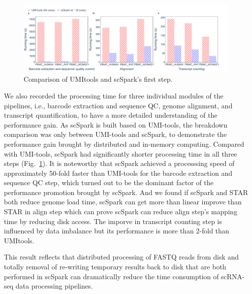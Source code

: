\documentclass[conference]{IEEEtran}
\begin{document}
\begin{figure}
	\centering
	\includegraphics[width=0.98\textwidth]{fig2.pdf}
	\caption{Comparison of UMI\-tools and scSpark's first step.} \label{fig2}
\end{figure}
We also recorded the processing time for three individual modules of the pipelines, i.e., barcode extraction and sequence QC, genome alignment, and transcript quantification, to have a more detailed understanding of the performance gain. 
As scSpark is built based on UMI-tools, the breakdown comparison was only between UMI-tools and scSpark, to demonstrate the performance gain brought by distributed and in-memory computing.
Compared with UMI-tools, scSpark had significantly shorter processing time in all three steps (Fig.~\ref{fig2}).
It is noteworthy that scSpark achieved a processsing speed of approximately 50-fold faster than UMI-tools for the barcode extraction and sequence QC step, which turned out to be the dominant factor of the performance promotion brought by scSpark.
And we found if scSpark and STAR both reduce genome load time, scSpark can get more than linear improve than STAR in align step which can prove scSpark can reduce align step's mapping time by reducing disk access.
The imporve in transcript counting step is influenced by data imbalance but its performance is more than 2-fold than UMI\-tools.

This result reflects that distributed processing of FASTQ reads from disk and totally removal of re-writing temporary results back to disk that are both performed in scSpark can dramatically reduce the time consumption of scRNA-seq data processing pipelines. 
\end{document}
